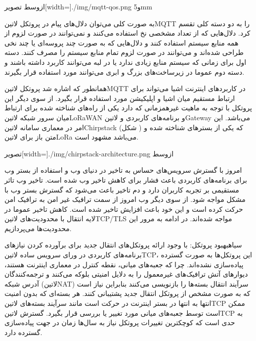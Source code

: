 ‌ازوسط
‌تصویر[width=\textwidth]{./img/mqtt-qos.png}
‌و{5mm}

به صورت کلی می‌توان دلال‌های پیام در پروتکل ‌لاتین{MQTT} را به دو دسته کلی تقسم کرد. دلال‌هایی که از تعداد مشخصی نخ استفاده می‌کنند و نمی‌توانند در صورت لزوم از همه منابع سیستم استفاده کنند و دلال‌هایی که به صورت چند پروسه‌ای یا چند نخی طراحی شده‌اند
و می‌توانند در صورت لزوم تمام منابع سیستم را مصرف کنند. دسته اول برای زمانی که سیستم منابع زیادی ندارد یا در لبه می‌توانند کاربرد داشته باشند و دسته دوم عموما در زیرساخت‌های بزرگ و ابری می‌توانند مورد استفاده قرار بگیرند.

همانطور که اشاره شد پروتکل ‌لاتین{MQTT} در کاربردهای اینترنت اشیا می‌تواند برای ارتباط مستقیم میان اشیا و اپلیکیشن مورد استفاده قرار بگیرد. از سوی دیگر این پروتکل با توجه به ماهیت غیرهمزمانی که دارد یکی از راه‌های شناخته شده برای ارتباط میان سرور شبکه ‌لاتین{LoRaWAN}
و برنامه‌های کاربردی و ‌لاتین{Gateway} می‌باشد. این امر در معماری سامانه ‌لاتین{Chirpstack} (شکل ) که یکی از بسترهای شناخته شده و متن باز برای ‌لاتین{LoRa} می‌باشد مشهود است.

‌تصویر[width=\textwidth]{./img/chirpstack-architecture.png}
‌ازوسط


امروز با گسترش سرویس‌های حساس به تاخیر در دنیای وب و استفاده از بستر وب برای برنامه‌های کاربردی باعث فشار برای کاهش تاخیر وب شده است. تاخیر وب تاثر مستقیمی بر تجربه کاربران دارد
و دم تاخیر باعث می‌شود که گسترش بستر وب با مشکل مواجه شود.
از سوی دیگر وب امروز از سمت ترافیک غیر امن به ترافیک امن حرکت کرده است و این خود باعث افزایش تاخیر شده است.
کاهش تاخیر عموما در لایه انتقال با محدودیت‌های ‌لاتین{TCP/TLS} مواجه شده‌اند. در ادامه به مرور این محدودیت‌ها می‌پردازیم.

‌سیاه{بهبود پروتکل}: با وجود ارائه پروتکل‌های انتقال جدید برای برآورده کردن نیازهای برنامه‌های کاربردی در ورای سرویس ساده ‌لاتین{TCP}، این پروتکل‌ها به صورت گسترده پیاده‌سازی نشده‌اند.
چرا که جعبه‌های میانی، نقطه کنترل در معماری اینترنت هستند، دیوارهای آتش ترافیک‌های غیرمعمول را به دلایل امنیتی بلوکه می‌کنند و ترجمه‌کنندگان آدرس شبکه (‌لاتین{NAT})
سرآیند انتقال بسته‌ها را بازنویسی می‌کنند بنابراین نیاز است که به صورت مشخص از پروتکل انتقال جدید پشتیبانی کنند.
هر بسته‌ای که بدون امنیت انتها به انتها در بستر اینترنت در حرکت است مانند سرآیند بسته‌های ‌لاتین{TCP} ممکن است توسط جعبه‌های میانی مورد تغییر یا بررسی قرار بگیرد.
گسترش ‌لاتین{TCP} به حدی است که کوچکترین تغییرات پروتکل نیاز به سال‌ها زمان در جهت پیاده‌سازی گسترده دارد.

